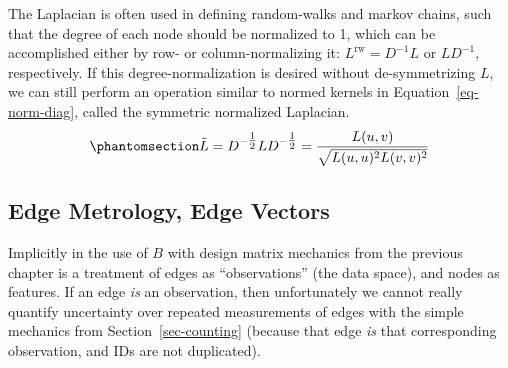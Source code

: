 \documentclass[%
	12pt,
		oneside,
		letterpaper
]{book}
\begin{document}
The Laplacian is often used in defining random-walks and markov chains,
such that the degree of each node should be normalized to 1, which can
be accomplished either by row- or column-normalizing it:
\(L^{\textrm{rw}}=D^{-1}L\) or \(LD^{-1}\), respectively. If this
degree-normalization is desired without de-symmetrizing \(L\), we can
still perform an operation similar to normed kernels in
Equation~\ref{eq-norm-diag}, called the symmetric normalized Laplacian.
\begin{equation}\phantomsection\label{eq-norm-laplacian}{
\tilde{L} = D^{-\tfrac{1}{2}}LD^{-\tfrac{1}{2}} = \frac{L(u,v)}{\sqrt{L(u,u)^2L(v,v)^2}}
}\end{equation}

\subsection{Edge Metrology, Edge
Vectors}\label{edge-metrology-edge-vectors}

Implicitly in the use of \(B\) with design matrix mechanics from the
previous chapter is a treatment of edges as ``observations'' (the data
space), and nodes as features. If an edge \emph{is} an observation, then
unfortunately we cannot really quantify uncertainty over repeated
measurements of edges with the simple mechanics from
Section~\ref{sec-counting} (because that edge \emph{is} that
corresponding observation, and IDs are not duplicated).
\end{document}
